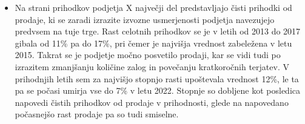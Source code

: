 \documentclass[12pt,a4paper]{amsart}
\theoremstyle{definition} %
\theoremstyle{plain} %
\begin{document}
\begin{itemize}
\begin{itemize}
\item Na strani prihodkov podjetja X največji del predstavljajo čisti prihodki od prodaje, ki se zaradi izrazite izvozne usmerjenosti podjetja navezujejo predvsem na tuje trge. Rast celotnih prihodkov se je v letih od 2013 do 2017 gibala od 11\% pa do 17\%, pri čemer je najvišja vrednost zabeležena v letu 2015. Takrat se je podjetje močno posvetilo prodaji, kar se vidi tudi po izrazitem zmanjšanju količine zalog in povečanju kratkoročnih terjatev. V prihodnjih letih sem za najvišjo stopnjo rasti upoštevala vrednost 12\%, le ta pa se počasi umirja vse do 7\% v letu 2022. Stopnje so dobljene kot posledica napovedi čistih prihodkov od prodaje v prihodnosti, glede na napovedano počasnejšo rast prodaje pa so tudi smiselne.
\end{itemize}


\end{itemize}
\end{document}

